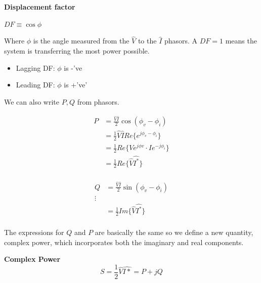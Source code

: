 \documentclass[../notes.tex]{subfiles}
\begin{document}
\begin{definition}
	\textbf{Displacement factor} 

	$ DF \equiv \cos \phi $ 

	Where $ \phi $ is the angle measured from the $ \hat{V} $ to the $ \hat{I} $ phasors.
	A $ DF = 1 $ means the system is transferring the most power possible.

	\begin{itemize}
		\item Lagging DF: $ \phi  $ is -'ve
		\item Leading DF: $ \phi  $ is +'ve'
	\end{itemize}
\end{definition}


We can also write $ P, Q$ from phasors.

\begin{equation}
	\begin{split}
		P  &= \frac{\hat{V} \hat{I}}{2} \cos(\phi_v - \phi_i) \\
			 &= \frac{1}{2} \hat{V} \hat{I} Re\{e^{j\phi_v - \phi_i}\} \\
			 &= \frac{1}{2} Re\{Ve^{j\phi v} \cdot I e^{-j\phi_i}  \} \\
			 &= \frac{1}{2} Re\{\hat{V} \hat{I^*}\} \\
	\end{split}
\end{equation}

\begin{equation}
	\begin{split}
		Q  &= \frac{\hat{V} \hat{I}}{2} \sin(\phi_v - \phi_i) \\
		\vdots \\
			 &= \frac{1}{2} Im \{\hat{V} \hat{I^*}\} \\
	\end{split}
\end{equation}


The expressions for $ Q $  and $ P $ are basically the same so we define a new quantity, complex power, which incorporates both the imaginary and real components.


\begin{definition}
	\textbf{Complex Power} 
	\begin{equation}
		S = \frac{1}{2} \hat{V} \hat{I*} = P + jQ
		\label{eq:349:complex_power}
	\end{equation}
	
\end{definition}
\end{document}

